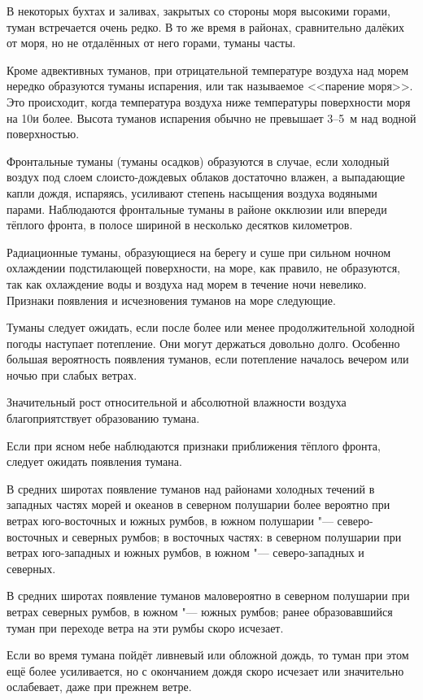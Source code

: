 В некоторых бухтах и заливах, закрытых со стороны моря высокими
горами, туман встречается очень редко. В то же время в районах,
сравнительно далёких от моря, но не отдалённых от него горами, туманы
часты.

Кроме адвективных туманов, при отрицательной температуре воздуха над
морем нередко образуются туманы испарения, или так называемое <<парение
моря>>. Это происходит, когда температура воздуха ниже температуры
поверхности моря на 10\grC и более. Высота туманов испарения обычно не
превышает 3--5~м над водной поверхностью.

Фронтальные туманы (туманы осадков) образуются в случае, если холодный
воздух под слоем слоисто-дождевых облаков достаточно влажен, а
выпадающие капли дождя, испаряясь, усиливают степень насыщения воздуха
водяными парами. Наблюдаются фронтальные туманы в районе окклюзии или
впереди тёплого фронта, в полосе шириной в несколько десятков
километров.

Радиационные туманы, образующиеся на берегу и суше при сильном ночном
охлаждении подстилающей поверхности, на море, как правило, не
образуются, так как охлаждение воды и воздуха над морем в течение ночи
невелико. Признаки появления и исчезновения туманов на море следующие.

 Туманы следует ожидать, если после более или менее
продолжительной холодной погоды наступает потепление. Они могут
держаться довольно долго. Особенно большая вероятность появления
туманов, если потепление началось вечером или ночью при слабых ветрах.

 Значительный рост относительной и абсолютной влажности воздуха
благоприятствует образованию тумана.

 Если при ясном небе наблюдаются признаки приближения тёплого
фронта, следует ожидать появления тумана.

 В средних широтах появление туманов над районами холодных течений
в западных частях морей и океанов в северном полушарии более вероятно
при ветрах юго-восточных и южных румбов, в южном
полушарии "--- северо-восточных и северных румбов; в восточных частях: в
северном полушарии при ветрах юго-западных и южных румбов, в южном "---
северо-западных и северных.

 В средних широтах появление туманов маловероятно в северном
полушарии при ветрах северных румбов, в южном "--- южных румбов; ранее
образовавшийся туман при переходе ветра на эти румбы скоро исчезает.

 Если во время тумана пойдёт ливневый или обложной дождь, то туман
при этом ещё более усиливается, но с окончанием дождя скоро исчезает
или значительно ослабевает, даже при прежнем ветре.

